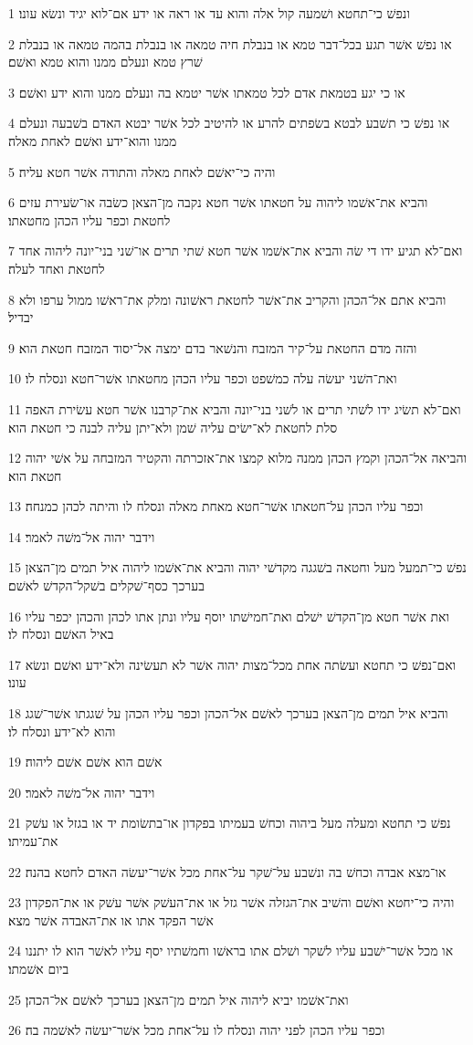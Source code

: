 \par 1 ונפשׁ כי־תחטא ושׁמעה קול אלה והוא עד או ראה או ידע אם־לוא יגיד ונשׂא עונו׃
\par 2 או נפשׁ אשׁר תגע בכל־דבר טמא או בנבלת חיה טמאה או בנבלת בהמה טמאה או בנבלת שׁרץ טמא ונעלם ממנו והוא טמא ואשׁם׃
\par 3 או כי יגע בטמאת אדם לכל טמאתו אשׁר יטמא בה ונעלם ממנו והוא ידע ואשׁם׃
\par 4 או נפשׁ כי תשׁבע לבטא בשׂפתים להרע או להיטיב לכל אשׁר יבטא האדם בשׁבעה ונעלם ממנו והוא־ידע ואשׁם לאחת מאלה׃
\par 5 והיה כי־יאשׁם לאחת מאלה והתודה אשׁר חטא עליה׃
\par 6 והביא את־אשׁמו ליהוה על חטאתו אשׁר חטא נקבה מן־הצאן כשׂבה או־שׂעירת עזים לחטאת וכפר עליו הכהן מחטאתו׃
\par 7 ואם־לא תגיע ידו די שׂה והביא את־אשׁמו אשׁר חטא שׁתי תרים או־שׁני בני־יונה ליהוה אחד לחטאת ואחד לעלה׃
\par 8 והביא אתם אל־הכהן והקריב את־אשׁר לחטאת ראשׁונה ומלק את־ראשׁו ממול ערפו ולא יבדיל׃
\par 9 והזה מדם החטאת על־קיר המזבח והנשׁאר בדם ימצה אל־יסוד המזבח חטאת הוא׃
\par 10 ואת־השׁני יעשׂה עלה כמשׁפט וכפר עליו הכהן מחטאתו אשׁר־חטא ונסלח לו׃
\par 11 ואם־לא תשׂיג ידו לשׁתי תרים או לשׁני בני־יונה והביא את־קרבנו אשׁר חטא עשׂירת האפה סלת לחטאת לא־ישׂים עליה שׁמן ולא־יתן עליה לבנה כי חטאת הוא׃
\par 12 והביאה אל־הכהן וקמץ הכהן ממנה מלוא קמצו את־אזכרתה והקטיר המזבחה על אשׁי יהוה חטאת הוא׃
\par 13 וכפר עליו הכהן על־חטאתו אשׁר־חטא מאחת מאלה ונסלח לו והיתה לכהן כמנחה׃
\par 14 וידבר יהוה אל־משׁה לאמר׃
\par 15 נפשׁ כי־תמעל מעל וחטאה בשׁגגה מקדשׁי יהוה והביא את־אשׁמו ליהוה איל תמים מן־הצאן בערכך כסף־שׁקלים בשׁקל־הקדשׁ לאשׁם׃
\par 16 ואת אשׁר חטא מן־הקדשׁ ישׁלם ואת־חמישׁתו יוסף עליו ונתן אתו לכהן והכהן יכפר עליו באיל האשׁם ונסלח לו׃
\par 17 ואם־נפשׁ כי תחטא ועשׂתה אחת מכל־מצות יהוה אשׁר לא תעשׂינה ולא־ידע ואשׁם ונשׂא עונו׃
\par 18 והביא איל תמים מן־הצאן בערכך לאשׁם אל־הכהן וכפר עליו הכהן על שׁגגתו אשׁר־שׁגג והוא לא־ידע ונסלח לו׃
\par 19 אשׁם הוא אשׁם אשׁם ליהוה׃
\par 20 וידבר יהוה אל־משׁה לאמר׃
\par 21 נפשׁ כי תחטא ומעלה מעל ביהוה וכחשׁ בעמיתו בפקדון או־בתשׂומת יד או בגזל או עשׁק את־עמיתו׃
\par 22 או־מצא אבדה וכחשׁ בה ונשׁבע על־שׁקר על־אחת מכל אשׁר־יעשׂה האדם לחטא בהנה׃
\par 23 והיה כי־יחטא ואשׁם והשׁיב את־הגזלה אשׁר גזל או את־העשׁק אשׁר עשׁק או את־הפקדון אשׁר הפקד אתו או את־האבדה אשׁר מצא׃
\par 24 או מכל אשׁר־ישׁבע עליו לשׁקר ושׁלם אתו בראשׁו וחמשׁתיו יסף עליו לאשׁר הוא לו יתננו ביום אשׁמתו׃
\par 25 ואת־אשׁמו יביא ליהוה איל תמים מן־הצאן בערכך לאשׁם אל־הכהן׃
\par 26 וכפר עליו הכהן לפני יהוה ונסלח לו על־אחת מכל אשׁר־יעשׂה לאשׁמה בה׃

